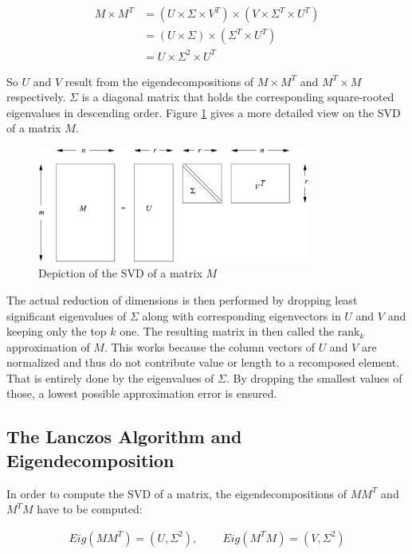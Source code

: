 \begin{align*}
M \times M^T 	& = (U \times \Sigma \times V^T) \times (V \times \Sigma^T \times
U^T) \\
					& = (U \times \Sigma) \times (\Sigma^T \times U^T) \\
					& = U \times \Sigma^2 \times U^T
\end{align*}

So $U$ and $V$ result from the eigendecompositions of $M\times M^T$ and $M^T\times M$ respectively. $\Sigma$ is a diagonal matrix that holds the corresponding square-rooted eigenvalues in descending order. Figure \ref{fig:svd} gives a more detailed view on the SVD of a matrix $M$. 

\begin{figure}[h]
	\centering
	\includegraphics[width=0.8\textwidth]{images/svd_mmds.png}
	\caption{Depiction of the SVD of a matrix $M$}
	\label{fig:svd}
\end{figure}

The actual reduction of dimensions is then performed by dropping least significant eigenvalues of $\Sigma$ along with corresponding eigenvectors in $U$ and $V$ and keeping only the top $k$ one. The resulting matrix in then called the $\text{rank}_k$ approximation of $M$. This works because the column vectors of $U$ and $V$ are normalized and thus do not contribute value or length to a recomposed element. That is entirely done by the eigenvalues of $\Sigma$. By dropping the smallest values of those, a lowest possible approximation error is ensured.

\subsection{The Lanczos Algorithm and Eigendecomposition}

In order to compute the SVD of a matrix, the eigendecompositions of $MM^T$ and $M^T M$ have to be computed:

\begin{align*}
	Eig(MM^T) = (U,\Sigma^2), \;	\;\;	\;\;	\;\;\;	Eig(M^T M) = (V,\Sigma^2)
\end{align*}

